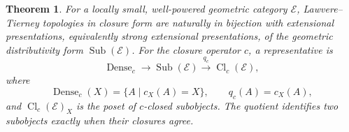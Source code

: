 \documentclass[12pt,oneside,reqno]{amsart}
\newtheorem{theorem}{Theorem}[section]
\theoremstyle{definition}
\theoremstyle{remark}
\begin{document}
\begin{theorem}\label{thm:subobject-topologies}
For a locally small, well-powered geometric category \(\mathscr E\),
Lawvere--Tierney topologies in closure form are naturally in bijection
with extensional presentations, equivalently strong extensional
presentations, of the geometric distributivity form
\(\operatorname{Sub}(\mathscr E)\).  For the closure operator \(c\), a
representative is
\begin{equation}\label{eq:subobject-short-exact}
 \operatorname{Dense}_c
 \longrightarrow\operatorname{Sub}(\mathscr E)
 \xrightarrow{\,q_c\,}\operatorname{Cl}_c(\mathscr E),
\end{equation}
where
\[
 \operatorname{Dense}_c(X)=\{A\mid c_X(A)=X\},
 \qquad q_c(A)=c_X(A),
\]
and \(\operatorname{Cl}_c(\mathscr E)_X\) is the poset of
\(c\)-closed subobjects.  The quotient identifies two subobjects
exactly when their closures agree.
\end{theorem}
\end{document}
